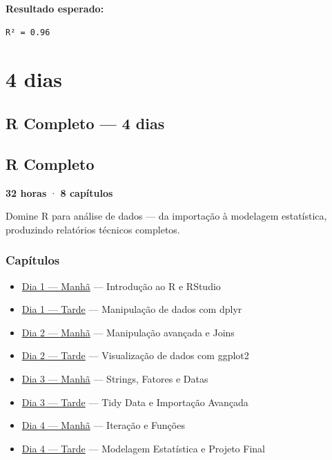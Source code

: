 \documentclass[
  letterpaper,
]{scrbook}
\providecommand{\tightlist}{%
  \setlength{\itemsep}{0pt}\setlength{\parskip}{0pt}}
\begin{document}
\textbf{Resultado esperado:}

\begin{verbatim}
R² = 0.96
\end{verbatim}

\part{4 dias}

\chapter{R Completo --- 4 dias}\label{r-completo-4-dias}

\chapter*{R Completo}\label{r-completo}


\textbf{32 horas} · \textbf{8 capítulos}

Domine R para análise de dados --- da importação à modelagem
estatística, produzindo relatórios técnicos completos.

\section{Capítulos}\label{capuxedtulos-2}

\begin{itemize}
\tightlist
\item
  \href{d1-manha.qmd}{Dia 1 --- Manhã} --- Introdução ao R e RStudio
\item
  \href{d1-tarde.qmd}{Dia 1 --- Tarde} --- Manipulação de dados com
  dplyr
\item
  \href{d2-manha.qmd}{Dia 2 --- Manhã} --- Manipulação avançada e Joins
\item
  \href{d2-tarde.qmd}{Dia 2 --- Tarde} --- Visualização de dados com
  ggplot2
\item
  \href{d3-manha.qmd}{Dia 3 --- Manhã} --- Strings, Fatores e Datas
\item
  \href{d3-tarde.qmd}{Dia 3 --- Tarde} --- Tidy Data e Importação
  Avançada
\item
  \href{d4-manha.qmd}{Dia 4 --- Manhã} --- Iteração e Funções
\item
  \href{d4-tarde.qmd}{Dia 4 --- Tarde} --- Modelagem Estatística e
  Projeto Final
\end{itemize}
\end{document}
